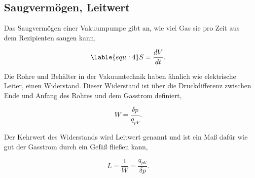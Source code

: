 \subsection{Saugvermögen, Leitwert}
\label{sec:Saugvermögen}
Das Saugvermögen einer Vakuumpumpe gibt an, wie viel Gas sie pro Zeit aus dem Rezipienten saugen kann,

    \begin{equation}
    \lable{equ:4}
        S = \frac{dV}{dt}.
    \end{equation}

Die Rohre und Behälter in der Vakuumtechnik haben ähnlich wie elektrische Leiter, einen Widerstand.
Dieser Widerstand ist über die Druckdifferenz zwischen Ende und Anfang des Rohres und dem Gasstrom definiert,

    \begin{equation}
    \label{equ:5}
        W = \frac{\delta p}{q_{pV}}.
    \end{equation}

Der Kehrwert des Widerstands wird Leitwert genannt und ist ein Maß dafür wie gut der Gasstrom durch ein Gefäß fließen kann,

    \begin{equation}
    \label{equ:6}
        L = \frac{1}{W} = \frac{q_{pV}}{\delta p}.
    \end{equation}


